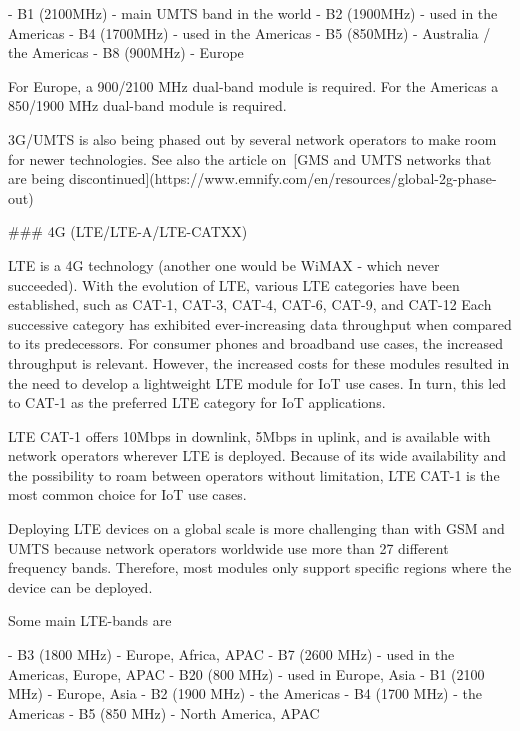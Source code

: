 \documentclass[11pt, oneside]{article}   	%
\newcommand{\addspace}{\vspace{2mm}}
\begin{document}
\begin{markdown}
- B1 (2100MHz) - main UMTS band in the world
- B2 (1900MHz) - used in the Americas
- B4 (1700MHz) - used in the Americas
- B5 (850MHz) - Australia / the Americas
- B8 (900MHz) - Europe
\end{markdown}
\addspace
\begin{markdown}
For Europe, a 900/2100 MHz dual-band module is required.
For the Americas a 850/1900 MHz dual-band module is required.

3G/UMTS is also being phased out by several network operators to make room for newer technologies.
See also the article on [GMS and UMTS networks that are being discontinued](https://www.emnify.com/en/resources/global-2g-phase-out)

### 4G (LTE/LTE-A/LTE-CATXX)

LTE is a 4G technology (another one would be WiMAX - which never succeeded).
With the evolution of LTE, various LTE categories have been established, such as CAT-1, CAT-3, CAT-4, CAT-6, CAT-9, and CAT-12 Each successive category has exhibited ever-increasing data throughput when compared to its predecessors.
For consumer phones and broadband use cases, the increased throughput is relevant.
However, the increased costs for these modules resulted in the need to develop a lightweight LTE module for IoT use cases.
In turn, this led to CAT-1 as the preferred LTE category for IoT applications.

LTE CAT-1 offers 10Mbps in downlink, 5Mbps in uplink, and is available with network operators wherever LTE is deployed.
Because of its wide availability and the possibility to roam between operators without limitation, LTE CAT-1 is the most common choice for IoT use cases.

Deploying LTE devices on a global scale is more challenging than with GSM and UMTS because network operators worldwide use more than 27 different frequency bands.
Therefore, most modules only support specific regions where the device can be deployed.

\end{markdown}
\pagebreak[4]

\begin{markdown}

Some main LTE-bands are

\end{markdown}
\addspace
\begin{markdown}
- B3 (1800 MHz) - Europe, Africa, APAC
- B7 (2600 MHz) - used in the Americas, Europe, APAC
- B20 (800 MHz) - used in Europe, Asia
- B1 (2100 MHz) - Europe, Asia
- B2 (1900 MHz) - the Americas
- B4 (1700 MHz) - the Americas
- B5 (850 MHz) - North America, APAC
\end{markdown}
\addspace
\end{document}
